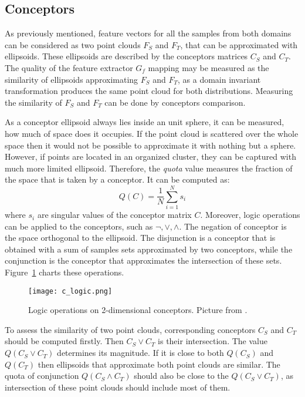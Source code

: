 \documentclass[shortabstract, inz, english]{iithesis}
\begin{document}
\subsection{Conceptors}
As previously mentioned, feature vectors for all the samples from both domains can be considered as two point clouds $F_{S}$ and $F_{T}$, that can be approximated with ellipsoids. These ellipsoids are described by the conceptors matrices $C_{S}$ and $C_{T}$. The quality of the feature extractor $G_{f}$ mapping may be measured as the similarity of ellipsoids approximating $F_{S}$ and $F_{T}$, as a domain invariant transformation produces the same point cloud for both distributions. Measuring the similarity of $F_{S}$ and $F_{T}$ can be done by conceptors comparison. 
\par
As a conceptor ellipsoid always lies inside an unit sphere, it can be measured, how much of space does it occupies. If the point cloud is scattered over the whole space then it would not be possible to approximate it with nothing but a sphere. However, if points are located in an organized cluster, they can be captured with much more limited ellipsoid. Therefore, the \textit{quota} value measures the fraction of the space that is taken by a conceptor. It can be computed as:
\begin{equation*}
    Q(C) = \frac{1}{N} \sum_{i=1}^{N}{s_{i}}
\end{equation*}
where $s_{i}$ are singular values of the conceptor matrix $C$. Moreover, logic operations  can be applied to the conceptors, such as $\neg, \vee, \wedge$. The negation of conceptor is the space orthogonal to the ellipsoid. The disjunction is a conceptor that is obtained with a sum of samples sets approximated by two conceptors, while the conjunction is the conceptor that approximates the intersection of these sets. Figure~\ref{fig:conceptor_logic} charts these operations.
\begin{figure}%
    \centering
    \texttt{[image: c\_logic.png]}%
    \caption{Logic operations on 2-dimensional conceptors. Picture from \cite{overc}.}
    \label{fig:conceptor_logic}%
\end{figure}
\par
To assess the similarity of two point clouds, corresponding conceptors $C_{S}$ and $C_{T}$ should be computed firstly. Then $C_{S} \vee C_{T}$ is their intersection. The value $Q(C_{S} \vee C_{T})$ determines its magnitude. If it is close to both $Q(C_{S})$ and $Q(C_{T})$ then ellipsoids that approximate both point clouds are similar. The quota of conjunction $Q(C_{S} \wedge C_{T})$ should also be close to the $Q(C_{S} \vee C_{T})$, as intersection of these point clouds should include most of them.
\end{document}
